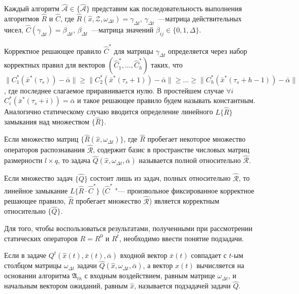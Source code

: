 \begin{Pred}
	\label{st:decompositon_dyn}
	Каждый алгоритм $\hat{\mathcal{A}}\in\{\hat{\mathcal{A}}\}$ представим как последовательность выполнения алгоритмов $\hat{R}$ и $\hat{C}$, где $\hat{R}(\hat{x}, \mathcal{Z}, \omega_{\Delta{t}})=\gamma_{\Delta{t}}$, $\gamma_{\Delta{t}}$~---матрица действительных чисел, $\hat{C}(\gamma_{\Delta{t}})=\beta_{\Delta{t}}$, $\beta_{\Delta{t}}$~---матрица значений $\beta_{ij}\in\{0,1,\Delta\}$.
\end{Pred}

Корректное решающее правило $\hat{C}^*$ для матрицы $\gamma_{\Delta{t}}$ определяется через набор корректных правил для векторов $(
\hat{C}_1^*, \dots, \hat{C}_h^*)$ таких, что $\|C_1^*(\bar{x}^*(\tau_s))-\bar{\alpha}\|\geqslant\|C_2^*(\bar{x}^*(\tau_s+1))-\bar{\alpha}\|\geqslant\dots\geqslant\|C_h^*(\bar{x}^*(\tau_s+h-1))-\bar{\alpha}\|$, где последнее слагаемое приравнивается нулю.  В простейшем случае $\forall{i}$ $C_i^*(\bar{x}^*(\tau_s+i))=\bar{\alpha}$ и такое решающее правило будем называть константным. Аналогично статическому случаю вводится определение линейного $L\{\hat{R}\}$ замыкания над множеством $\{\hat{R}\}$. 

\begin{Def}
	Если множество матриц $\{\hat R(\hat x,\omega_{\Delta t})\}$, где $\hat R$ пробегает некоторое множество операторов распознавания $\hat{\mathcal R}$, содержит базис в пространстве числовых матриц размерности $l\times q$, то задача $\hat Q(\hat x,\omega_{\Delta t},\bar{\alpha})$ называется полной относительно $\hat{\mathcal R}$.
\end{Def}

\begin{Pred}
	\label{pred:correctness_d}
	Если множество задач $\{\hat Q\}$ состоит лишь из задач, полных относительно $\hat{\mathcal R}$, то линейное замыкание $L\{\hat R{\cdot}\hat C^*\}$ ($\hat C^*$ "--- произвольное фиксированное корректное решающее правило, $\hat R$ пробегает множество $\hat{\mathcal R}$) является корректным относительно $\{\hat Q\}$.
\end{Pred}
	
Для того, чтобы воспользоваться результатами, полученными при рассмотрении статических операторов $R=R^0$ и $R^t$, необходимо ввести понятие подзадачи.

\begin{Def}
	Если в задаче $Q^t(\hat x(t),\bar x(t),\bar\alpha)$ входной вектор $\bar x(t)$ совпадает с $t$-ым столбцом матрицы $\omega_{\Delta t}$ задачи $\hat Q(\hat x,\omega_{\Delta t},\bar\alpha)$, а вектор $\hat x(t)$ вычисляется на основании алгоритма $\mathfrak A_{th}$ с входным воздействием, равным матрице $\omega_{\Delta t}$, и начальным вектором ожиданий, равным $\hat x$, называется подзадачей задачи $\hat Q$.
\end{Def}


